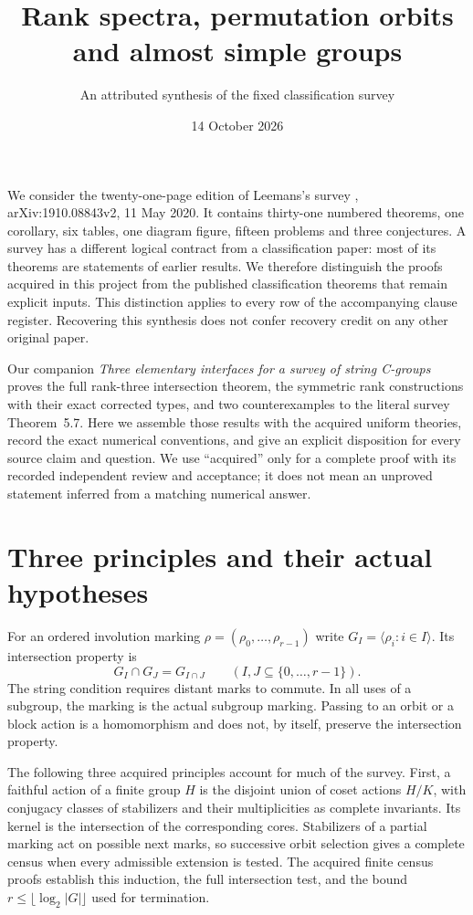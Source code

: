\documentclass[11pt]{article}
\title{Rank spectra, permutation orbits and almost simple groups}
\author{An attributed synthesis of the fixed classification survey}
\date{14 October 2026}
\newcommand{\gen}[1]{\langle#1\rangle}
\begin{document}
\maketitle

We consider the twenty-one-page edition of Leemans's survey
\cite{survey}, arXiv:1910.08843v2, 11 May 2020. It contains thirty-one
numbered theorems, one corollary, six tables, one diagram figure,
fifteen problems and three conjectures. A survey has a different
logical contract from a classification paper: most of its theorems
are statements of earlier results. We therefore distinguish the proofs
acquired in this project from the published classification theorems
that remain explicit inputs. This distinction applies to every row
of the accompanying clause register. Recovering this synthesis does
not confer recovery credit on any other original paper.

Our companion \emph{Three elementary interfaces for a survey of string C-groups} proves the full rank-three intersection theorem,
the symmetric rank constructions with their exact corrected types,
and two counterexamples to the literal survey Theorem~5.7.
Here we assemble those results with the acquired uniform theories,
record the exact numerical conventions, and give an explicit disposition
for every source claim and question. We use ``acquired'' only for a complete proof
with its recorded independent review and acceptance; it does not mean
an unproved statement inferred from a matching numerical answer.

\section{Three principles and their actual hypotheses}
For an ordered involution marking $\rho=(\rho_0,\ldots,\rho_{r-1})$
write $G_I=\gen{\rho_i:i\in I}$. Its intersection property is
\[
                  G_I\cap G_J=G_{I\cap J}\qquad(I,J\subseteq\{0,\ldots,r-1\}).
\]
The string condition requires distant marks to commute. In all uses
of a subgroup, the marking is the actual subgroup marking. Passing
to an orbit or a block action is a homomorphism and does not, by
itself, preserve the intersection property.

The following three acquired principles account for much of the survey.
First, a faithful action of a finite group $H$ is the disjoint union
of coset actions $H/K$, with conjugacy classes of stabilizers and their
multiplicities as complete invariants. Its kernel is the intersection
of the corresponding cores. Stabilizers of a partial marking act on
possible next marks, so successive orbit selection gives a complete
census when every admissible extension is tested. The acquired finite
census proofs establish this induction, the full intersection test,
and the bound $r\le\lfloor\log_2|G|\rfloor$ used for termination.
\end{document}
